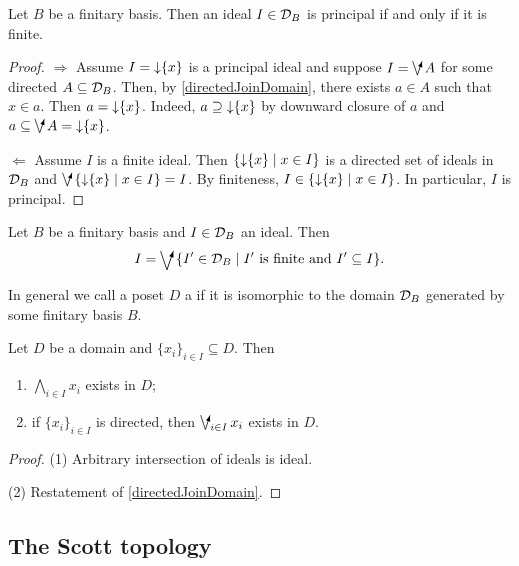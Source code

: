\begin{proposition}
Let $B$ be a finitary basis. Then an ideal $I\in\mathcal{D}_B$ is principal \textup{if and only if} it is finite.
\end{proposition}
\begin{proof}
$\boxed{\Rightarrow}$ Assume $I = \operatorname{\downarrow}\{x\}$ is a principal ideal and suppose $I = \dirvee A$ for some directed $A\subseteq \mathcal{D}_B$. Then, by \ref{directedJoinDomain}, there exists $a\in A$ such that $x\in a$. Then $a = \operatorname{\downarrow}\{x\}$. Indeed, $a \supseteq \operatorname{\downarrow}\{x\}$ by downward closure of $a$ and  $a\subseteq\dirvee A = \downset\{x\}$.

$\boxed{\Leftarrow}$ Assume $I$ is a finite ideal. Then $\setbuilder{\downset\{x\}}{x\in I}$ is a directed set of ideals in $\mathcal{D}_B$ and $\dirvee\setbuilder{\downset\{x\}}{x\in I} = I$. By finiteness, $I\in \setbuilder{\downset\{x\}}{x\in I}$. In particular, $I$ is principal.
\end{proof}
\begin{corollary} \label{finiteDecompositionIdeal}
Let $B$ be a finitary basis and $I\in\mathcal{D}_B$ an ideal. Then
\[ I = \dirvee \setbuilder{I'\in \domain_B}{\text{$I'$ is finite and $I'\subseteq I$}}. \]
\end{corollary}

\begin{definition}
In general we call a poset $D$ a  if it is isomorphic to the domain $\mathcal{D}_B$ generated by some finitary basis $B$.
\end{definition}

\begin{lemma}
Let $D$ be a domain and $\{x_i\}_{i\in I}\subseteq D$. Then
\begin{enumerate}
\item $\bigwedge_{i\in I} x_i$ exists in $D$;
\item if $\{x_i\}_{i\in I}$ is directed, then $\dirvee_{i\in I} x_i$ exists in $D$.
\end{enumerate}
\end{lemma}
\begin{proof}
(1) Arbitrary intersection of ideals is ideal.

(2) Restatement of \ref{directedJoinDomain}.
\end{proof}

\subsection{The Scott topology}


